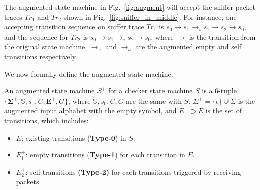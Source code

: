 The augmented state machine in Fig.~\ref{fig:augment} will accept the sniffer
packet traces $Tr_1$ and $Tr_2$ shown in Fig.~\ref{fig:sniffer_in_middle}.
%
For instance, one accepting transition sequence on sniffer trace $Tr_1$ is
$s_0\rightarrow s_1 \rightarrow_s s_1\rightarrow s_2 \rightarrow s_0$, and the
sequence for $Tr_2$ is $s_0 \rightarrow s_1 \rightarrow_e s_2 \rightarrow s_0$,
where $\rightarrow$ is the transition from the original state machine,
$\rightarrow_e$ and $\rightarrow_s$ are the augmented empty and self transitions
respectively.

We now formally define the augmented state machine.

\begin{definition}
  An augmented state machine $S^+$ for a checker state machine $S$ is a 6-tuple
  $\{\boldsymbol{\Sigma^+}, \mathbb{S}, s_0, C, \boldsymbol{E^+}, G\}$, where $\mathbb{S},
  s_0, C, G$ are the same with $S$. $\Sigma^+=\{\epsilon\} \cup \Sigma$ is
  the augmented input alphabet with the empty symbol, and $E^+ \supset E$ is the
  set of transitions, which includes:
  \begin{itemize}
    \item $E$: existing transitions (\textbf{Type-0}) in $S$.
    \item $E^+_1$: empty transitions (\textbf{Type-1}) for each transition in $E$.
    \item $E^+_2$: self transitions \textbf{(Type-2)} for each transitions
      triggered by receiving packets.
  \end{itemize}
\end{definition}

